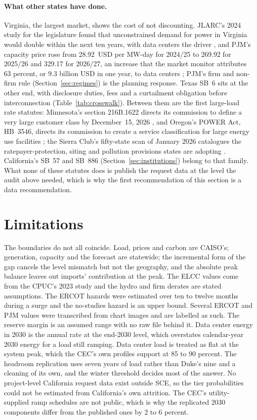 \paragraph{What other states have done.} Virginia, the largest market, shows the cost of not discounting. JLARC's 2024 study for the legislature found that unconstrained demand for power in Virginia would double within the next ten years, with data centers the driver \citep{jlarc2024}, and PJM's capacity price rose from 28.92~USD per MW-day for 2024/25 to 269.92 for 2025/26 and 329.17 for 2026/27, an increase that the market monitor attributes 63 percent, or 9.3 billion USD in one year, to data centers \citep{ieefa2025}; PJM's firm and non-firm rule (Section~\ref{sec:regimes}) is the planning response. Texas SB~6 sits at the other end, with disclosure duties, fees and a curtailment obligation before interconnection (Table~\ref{tab:crosswalk}). Between them are the first large-load rate statutes: Minnesota's section 216B.1622 directs its commission to define a very large customer class by December~15, 2026 \citep{mn216b1622}, and Oregon's POWER Act, HB~3546, directs its commission to create a service classification for large energy use facilities \citep{or_hb3546}; the Sierra Club's fifty-state scan of January 2026 catalogues the ratepayer-protection, siting and pollution provisions states are adopting \citep{sierra2026}. California's SB~57 and SB~886 (Section~\ref{sec:institutions}) belong to that family. What none of these statutes does is publish the request data at the level the audit above needed, which is why the first recommendation of this section is a data recommendation.

\section{Limitations}
\label{sec:limitations}

The boundaries do not all coincide. Load, prices and carbon are CAISO's; generation, capacity and the forecast are statewide; the incremental form of the gap cancels the level mismatch but not the geography, and the absolute peak balance leaves out imports' contribution at the peak. The ELCC values come from the CPUC's 2023 study and the hydro and firm derates are stated assumptions. The ERCOT hazards were estimated over ten to twelve months during a surge and the no-studies hazard is an upper bound. Several ERCOT and PJM values were transcribed from chart images and are labelled as such. The reserve margin is an assumed range with no raw file behind it. Data center energy in 2030 is the annual rate at the end-2030 level, which overstates calendar-year 2030 energy for a load still ramping. Data center load is treated as flat at the system peak, which the CEC's own profiles support at 85 to 90 percent. The headroom replication uses seven years of load rather than Duke's nine and a cleaning of its own, and the winter threshold decides most of the answer. No project-level California request data exist outside SCE, so the tier probabilities could not be estimated from California's own attrition. The CEC's utility-supplied ramp schedules are not public, which is why the replicated 2030 components differ from the published ones by 2 to 6 percent.

